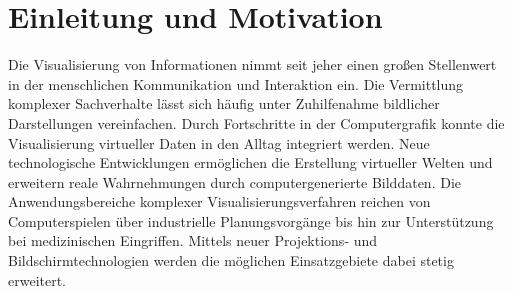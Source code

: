 \chapter{Einleitung und Motivation}

\prever{
}

Die Visualisierung von Informationen nimmt seit jeher einen großen Stellenwert in der menschlichen Kommunikation und Interaktion ein. Die Vermittlung komplexer Sachverhalte lässt sich häufig unter Zuhilfenahme bildlicher Darstellungen vereinfachen. Durch Fortschritte in der Computergrafik konnte die Visualisierung virtueller Daten in den Alltag integriert werden. Neue technologische Entwicklungen ermöglichen die Erstellung virtueller Welten und erweitern reale Wahrnehmungen durch computergenerierte Bilddaten. Die Anwendungsbereiche komplexer Visualisierungsverfahren reichen von Computerspielen über industrielle Planungsvorgänge bis hin zur Unterstützung bei medizinischen Eingriffen. Mittels neuer Projektions- und Bildschirmtechnologien werden die möglichen Einsatzgebiete dabei stetig erweitert.\\

